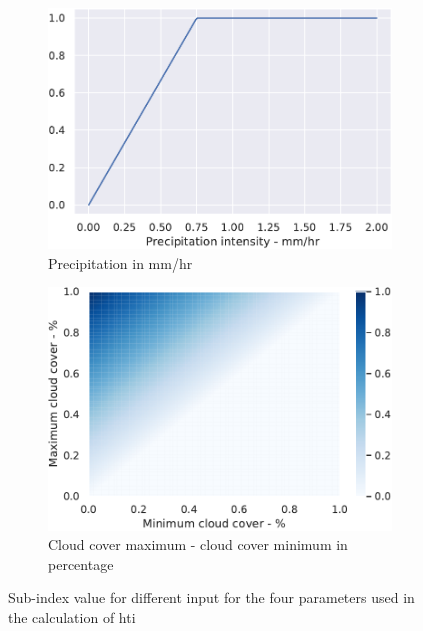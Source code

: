 \begin{figure}
    \begin{subfigure}{.45\textwidth}
    \centering
    \includegraphics[width = \textwidth]{Figures/Pvar.pdf}
    \caption{Precipitation in mm/hr}
    \label{fig:precipitation}
    \end{subfigure}
    \begin{subfigure}{.45\textwidth}
    \centering
    \includegraphics[width = \textwidth]{Figures/CCvar.pdf}
    \caption{Cloud cover maximum - cloud cover minimum in percentage}
    \label{fig:cloud cover}
    \end{subfigure}
    \caption{Sub-index value for different input for the four parameters used in the calculation of \acrshort{hti}}
    \label{fig:subindices}
\end{figure}

